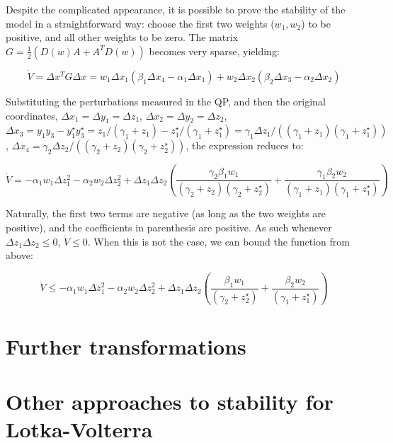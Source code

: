 \documentclass{article}
\begin{document}
Despite the complicated appearance, it is possible to prove the
stability of the model in a straightforward way: choose the first two
weights (\(w_1, w_2\)) to be positive, and all other weights to be zero.
The matrix \(G = \frac{1}{2}(D(w)A + A^T D(w))\) becomes very sparse,
yielding:

\begin{equation}
\dot{V} = \Delta x^T G \Delta x = w_1 \Delta x_1 (\beta_1 \Delta x_4 - \alpha_1 \Delta x_1) + w_2 \Delta x_2 (\beta_2 \Delta x_3 - \alpha_2 \Delta x_2)
\end{equation}

Substituting the perturbations measured in the QP, and then the original
coordinates, \(\Delta x_1 = \Delta y_1 = \Delta z_1\),
\(\Delta x_2 = \Delta y_2 = \Delta z_2\),
\(\Delta x_3 = y_1 y_3 - y_1^\star y_3^\star = z_1 / (\gamma_1 + z_1) - z_1^\star / (\gamma_1 + z_1^\star) = \gamma_1 \Delta z_1 / ((\gamma_1 + z_1) (\gamma_1 + z_1^\star))\),
\(\Delta x_4 = \gamma_2 \Delta z_2 / ((\gamma_2 + z_2) (\gamma_2 + z_2^\star))\),
the expression reduces to:

\begin{equation}
\dot{V} = - \alpha_1 w_1 \Delta z_1^2 - \alpha_2 w_2 \Delta z_2^2 + \Delta z_1 \Delta z_2 \left(\frac{\gamma_2 \beta_1 w_1}{(\gamma_2 +z_2)(\gamma_2 +z_2^\star)} + \frac{\gamma_1 \beta_2 w_2}{(\gamma_1 +z_1)(\gamma_1 +z_1^\star)} \right)
\end{equation}

Naturally, the first two terms are negative (as long as the two weights
are positive), and the coefficients in parenthesis are positive. As such
whenever \(\Delta z_1 \Delta z_2 \leq 0\), \(\dot{V} \leq 0\). When this
is not the case, we can bound the function from above:

\begin{equation}
\dot{V} \leq - \alpha_1 w_1 \Delta z_1^2 - \alpha_2 w_2 \Delta z_2^2 + \Delta z_1 \Delta z_2 \left(\frac{\beta_1 w_1}{(\gamma_2 +z_2^\star)} + \frac{\beta_2 w_2}{(\gamma_1 +z_1^\star)} \right)
\end{equation}

\hypertarget{further-transformations}{%
\section{Further transformations}\label{further-transformations}}

\hypertarget{other-approaches-to-stability-for-lotka-volterra}{%
\section{Other approaches to stability for
Lotka-Volterra}\label{other-approaches-to-stability-for-lotka-volterra}}
\end{document}
